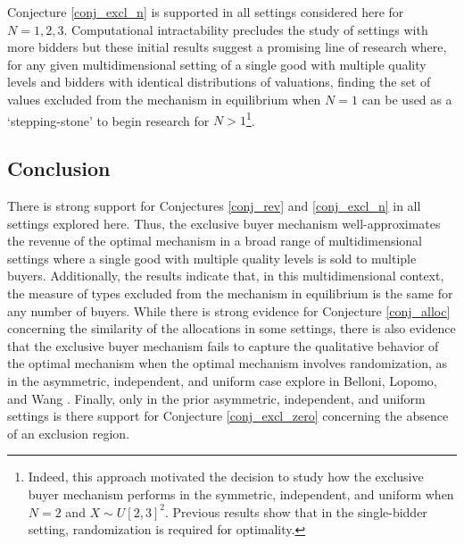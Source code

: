 Conjecture \ref{conj_excl_n} is supported in all settings considered here for $N=1,2,3$. Computational intractability precludes the study of settings with more bidders but these initial results suggest a promising line of research where, for any given multidimensional setting of a single good with multiple quality levels and bidders with identical distributions of valuations, finding the set of values excluded from the mechanism in equilibrium when $N=1$ can be used as a `stepping-stone' to begin research for $N>1$\footnote{Indeed, this approach motivated the decision to study how the exclusive buyer mechanism performs in the symmetric, independent, and uniform when $N=2$ and $X \sim U[2,3]^2$. Previous results \autocite{pavlov2011optimal} show that in the single-bidder setting, randomization is required for optimality.}. 











\subsection{Conclusion}

There is strong support for Conjectures \ref{conj_rev} and \ref{conj_excl_n} in all settings explored here. Thus, the exclusive buyer mechanism well-approximates the revenue of the optimal mechanism in a broad range of multidimensional settings where a single good with multiple quality levels is sold to multiple buyers. Additionally, the results indicate that, in this multidimensional context, the measure of types excluded from the mechanism in equilibrium is the same for any number of buyers. While there is strong evidence for Conjecture \ref{conj_alloc} concerning the similarity of the allocations in some settings, there is also evidence that the exclusive buyer mechanism fails to capture the qualitative behavior of the optimal mechanism when the optimal mechanism involves randomization, as in the asymmetric, independent, and uniform case explore in Belloni, Lopomo, and Wang \autocite*{belloni2010multidimensional}. Finally, only in the prior asymmetric, independent, and uniform settings is there support for Conjecture \ref{conj_excl_zero} concerning the absence of an exclusion region.

